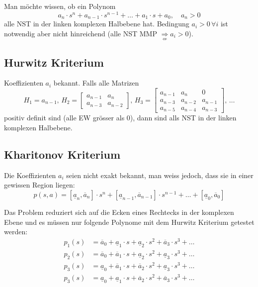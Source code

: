 Man möchte wissen, ob ein Polynom
\begin{equation*}
    a_n\cdot s^n + a_{n-1}\cdot s^{n-1} + \dots + a_1\cdot s + a_0,\quad a_n > 0
\end{equation*}
alle NST in der linken komplexen Halbebene hat. Bedingung $a_i>0\, \forall i$ ist notwendig aber nicht hinreichend \Big(alle  NST MMP $\underset{\not\Leftarrow}{\Rightarrow} a_i > 0$\Big).

\subsection{Hurwitz Kriterium}
    Koeffizienten $a_i$ bekannt. Falls alle Matrizen
    \begin{equation*}
        H_1 = a_{n-1}, \,
        H_2 =
        \begin{bmatrix}
            a_{n-1} & a_n\\
            a_{n-3} & a_{n-2}
        \end{bmatrix}, \,
        H_3 = 
        \begin{bmatrix}
            a_{n-1} & a_n   & 0\\
            a_{n-3} & a_{n-2} & a_{n-1}\\
            a_{n-5} & a_{n-4} & a_{n-3}
        \end{bmatrix}, \, \dots
    \end{equation*}
    positiv definit sind (alle EW grösser als 0), dann sind alls NST in der linken komplexen Halbebene.
    
\subsection{Kharitonov Kriterium}
    Die Koeffizienten $a_i$ seien nicht exakt bekannt, man weiss jedoch, dass sie in einer gewissen Region liegen:
    \begin{equation*}
        p(s,a) = [\underline{a}_n,\overline{a}_n]\cdot s^n +  [\underline{a}_{n-1},\overline{a}_{n-1}]\cdot s^{n-1} + \dots +  [\underline{a}_0,\overline{a}_0]
    \end{equation*}
    
    Das Problem reduziert sich auf die Ecken eines Rechtecks in der komplexen Ebene und es müssen nur folgende Polynome mit dem Hurwitz Kriterium getestet werden:
    \begin{align*}
        p_1(s) &= \overline{a}_0 + \underline{a}_1\cdot s +\underline{a}_2\cdot s^2 + \overline{a}_3\cdot s^3 + \dots\\
        p_2(s) &= \overline{a}_0 + \overline{a}_1\cdot s +\underline{a}_2\cdot s^2 + \underline{a}_3\cdot s^3 + \dots\\
        p_3(s) &= \underline{a}_0 + \overline{a}_1\cdot s +\overline{a}_2\cdot s^2 + \underline{a}_3\cdot s^3 + \dots\\
        p_3(s) &= \underline{a}_0 + \underline{a}_1\cdot s +\overline{a}_2\cdot s^2 + \overline{a}_3\cdot s^3 + \dots\\
    \end{align*}